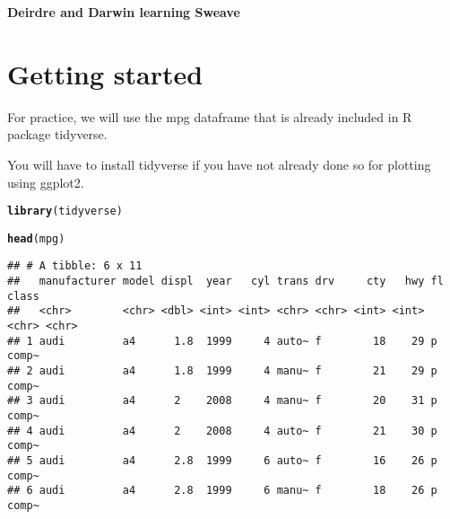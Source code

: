 \documentclass{article}\usepackage[]{graphicx}\usepackage[]{color}
\makeatletter
\newcommand{\hlstd}[1]{\textcolor[rgb]{0.345,0.345,0.345}{#1}}%
\newcommand{\hlkwd}[1]{\textcolor[rgb]{0.737,0.353,0.396}{\textbf{#1}}}%
\newenvironment{kframe}{%
 \def\at@end@of@kframe{}%
 \ifinner\ifhmode%
  \def\at@end@of@kframe{\end{minipage}}%
  \begin{minipage}{\columnwidth}%
 \fi\fi%
 \def\FrameCommand##1{\hskip\@totalleftmargin \hskip-\fboxsep
 \colorbox{shadecolor}{##1}\hskip-\fboxsep
     \hskip-\linewidth \hskip-\@totalleftmargin \hskip\columnwidth}%
 \MakeFramed {\advance\hsize-\width
   \@totalleftmargin\z@ \linewidth\hsize
   \@setminipage}}%
 {\par\unskip\endMakeFramed%
 \at@end@of@kframe}
\newenvironment{knitrout}{}{} %
\newcommand{\hlstd}[1]{\textcolor[rgb]{0.345,0.345,0.345}{#1}}%
\newcommand{\hlkwd}[1]{\textcolor[rgb]{0.737,0.353,0.396}{\textbf{#1}}}%
\newenvironment{kframe}{%
 \def\at@end@of@kframe{}%
 \ifinner\ifhmode%
  \def\at@end@of@kframe{\end{minipage}}%
  \begin{minipage}{\columnwidth}%
 \fi\fi%
 \def\FrameCommand##1{\hskip\@totalleftmargin \hskip-\fboxsep
 \colorbox{shadecolor}{##1}\hskip-\fboxsep
     \hskip-\linewidth \hskip-\@totalleftmargin \hskip\columnwidth}%
 \MakeFramed {\advance\hsize-\width
   \@totalleftmargin\z@ \linewidth\hsize
   \@setminipage}}%
 {\par\unskip\endMakeFramed%
 \at@end@of@kframe}
\newenvironment{knitrout}{}{} %
\makeatother
\begin{document}
\noindent \textbf{\Large{Deirdre and Darwin learning Sweave}}
\author{Deirdre & Darwin }

\section {Getting started}
\newline 

For practice, we will use the mpg dataframe that is already included in R package tidyverse. 

You will have to install tidyverse if you have not already done so for plotting using ggplot2.

\begin{knitrout}
\color{fgcolor}\begin{kframe}
\begin{alltt}
\hlkwd{library}\hlstd{(tidyverse)}
\end{alltt}


{\ttfamily\noindent\itshape\color{messagecolor}{\#\# -- Attaching packages ---------------------------------- tidyverse 1.2.1 --}}

{\ttfamily\noindent\itshape\color{messagecolor}{\#\# √ ggplot2 3.0.0\ \ \ \  √ purrr\ \  0.2.5\\\#\# √ tibble\ \ 1.4.2\ \ \ \  √ dplyr\ \  0.7.6\\\#\# √ tidyr\ \  0.8.1\ \ \ \  √ stringr 1.3.1\\\#\# √ readr\ \  1.1.1\ \ \ \  √ forcats 0.3.0}}

{\ttfamily\noindent\itshape\color{messagecolor}{\#\# -- Conflicts ------------------------------------- tidyverse\_conflicts() --\\\#\# x dplyr::filter() masks stats::filter()\\\#\# x dplyr::lag()\ \ \ \ masks stats::lag()}}\begin{alltt}
\hlkwd{head}\hlstd{(mpg)}
\end{alltt}
\begin{verbatim}
## # A tibble: 6 x 11
##   manufacturer model displ  year   cyl trans drv     cty   hwy fl    class
##   <chr>        <chr> <dbl> <int> <int> <chr> <chr> <int> <int> <chr> <chr>
## 1 audi         a4      1.8  1999     4 auto~ f        18    29 p     comp~
## 2 audi         a4      1.8  1999     4 manu~ f        21    29 p     comp~
## 3 audi         a4      2    2008     4 manu~ f        20    31 p     comp~
## 4 audi         a4      2    2008     4 auto~ f        21    30 p     comp~
## 5 audi         a4      2.8  1999     6 auto~ f        16    26 p     comp~
## 6 audi         a4      2.8  1999     6 manu~ f        18    26 p     comp~
\end{verbatim}
\end{kframe}
\end{knitrout}
\end{document}
